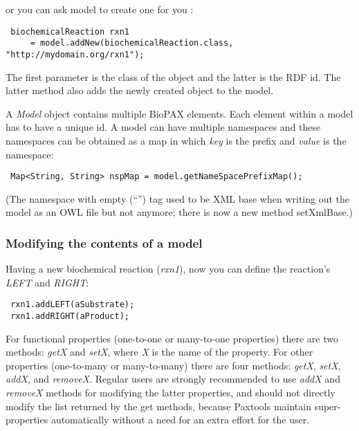 \documentclass[10pt]{article}
\newenvironment{mylisting}
{\begin{list}{}{\setlength{\leftmargin}{2em}}\item\small\bfseries}
{\end{list}}
\begin{document}
or you can ask model to create one for you :

\begin{mylisting}
\begin{verbatim}
 biochemicalReaction rxn1 
     = model.addNew(biochemicalReaction.class, "http://mydomain.org/rxn1");
\end{verbatim}
\end{mylisting}

The first parameter is the class of the object and the latter is the RDF id. The latter method also adds the newly created object to the model.

A \textit{Model} object contains multiple BioPAX elements. Each element within a model has to have a unique id. A model can have multiple namespaces and these namespaces can be obtained as a map in which \textit{key} is the prefix and \textit{value} is the namespace:

\begin{mylisting}
\begin{verbatim}
 Map<String, String> nspMap = model.getNameSpacePrefixMap();
\end{verbatim}
\end{mylisting}

(The namespace with empty (``'') tag used to be XML base when writing out the model as an OWL file but not anymore; there is now a new method setXmlBase.)

\subsubsection{Modifying the contents of a model}
Having a new biochemical reaction (\textit{rxn1}), now you can define the reaction's \textit{LEFT} and \textit{RIGHT}:

\begin{mylisting}
\begin{verbatim}
 rxn1.addLEFT(aSubstrate);
 rxn1.addRIGHT(aProduct);
\end{verbatim}
\end{mylisting}

For functional properties (one-to-one or many-to-one properties) there are two methods: \textit{getX} and \textit{setX}, where \textit{X} is the name of the property. For other properties (one-to-many or many-to-many) there are four methods: \textit{getX}, \textit{setX}, \textit{addX}, and \textit{removeX}. Regular users are strongly recommended to use \textit{addX} and \textit{removeX} methods for modifying the latter properties, and should not directly modify the list returned by the get methods, because Paxtools maintain super-properties automatically without a need for an extra effort for the user.
\end{document}
